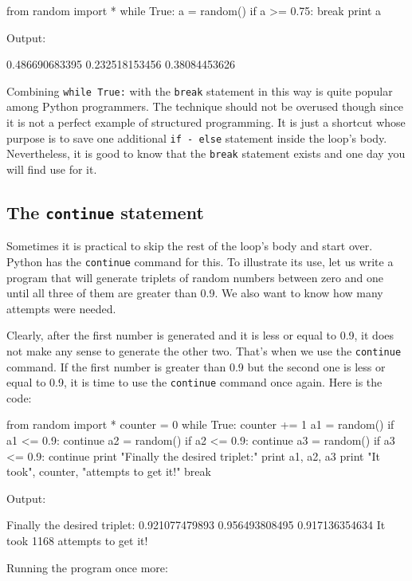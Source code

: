 \begin{bluecode}
from random import *
while True:
    a = random()
    if a >= 0.75: 
        break
    print a
\end{bluecode}
Output:

\begin{bluecode}
0.486690683395
0.232518153456
0.38084453626
\end{bluecode}
Combining {\tt while True:} with the {\tt break} statement in this way is 
quite popular among Python programmers. The technique should not be overused 
though since it is not a perfect example of structured programming. It is 
just a shortcut whose purpose is to save one additional {\tt if - else} statement
inside the loop's body. Nevertheless, it is good to know that the 
{\tt break} statement exists and one day you will find use for it.

\subsection{The {\tt continue} statement}

Sometimes it is practical to skip the rest of the loop's body and start over. Python 
has the {\tt continue} command for this. To illustrate its use, let us write 
a program that will generate triplets of random numbers between zero and one
until all three of them are greater than 0.9. We also want to know how many 
attempts were needed. 

Clearly, after the first number is generated and it is less or equal to 0.9,
it does not make any sense to generate the other two. That's when 
we use the {\tt continue} command. If the first number is greater than 0.9 
but the second one is less or equal to 0.9, it is time to use the {\tt continue} 
command once again. Here is the code:

\begin{bluecode}
from random import *
counter = 0
while True:
    counter += 1
    a1 = random()
    if a1 <= 0.9:
        continue
    a2 = random()
    if a2 <= 0.9:
        continue
    a3 = random()
    if a3 <= 0.9:
        continue
    print "Finally the desired triplet:" 
    print a1, a2, a3
    print "It took", counter, "attempts to get it!"
    break
\end{bluecode}
Output:

\begin{bluecode}
Finally the desired triplet:
0.921077479893 0.956493808495 0.917136354634
It took 1168 attempts to get it!
\end{bluecode}
Running the program once more:

